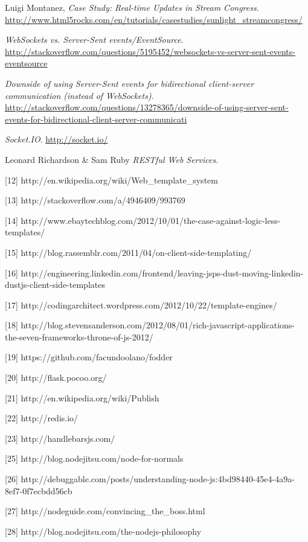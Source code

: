 \documentclass[doc,helv,longtable]{article}
\begin{document}
\begin{thebibliography}{150}
  Luigi Montanez,
  \emph{Case Study: Real-time Updates in Stream Congress}.
  \url{http://www.html5rocks.com/en/tutorials/casestudies/sunlight_streamcongress/}

  \emph{WebSockets vs. Server-Sent events/EventSource}.
  \url{http://stackoverflow.com/questions/5195452/websockets-vs-server-sent-events-eventsource}

  \emph{Downside of using Server-Sent events for bidirectional client-server communication (instead of WebSockets)}.
  \url{http://stackoverflow.com/questions/13278365/downside-of-using-server-sent-events-for-bidirectional-client-server-communicati}

  \emph{Socket.IO}.
  \url{http://socket.io/}

  Leonard Richardson & Sam Ruby
  \emph{RESTful Web Services}.


[12] http://en.wikipedia.org/wiki/Web_template_system

[13] http://stackoverflow.com/a/4946409/993769

[14] http://www.ebaytechblog.com/2012/10/01/the-case-against-logic-less-templates/

[15] http://blog.rassemblr.com/2011/04/on-client-side-templating/

[16] http://engineering.linkedin.com/frontend/leaving-jsps-dust-moving-linkedin-dustjs-client-side-templates

[17] http://codingarchitect.wordpress.com/2012/10/22/template-engines/

[18] http://blog.stevensanderson.com/2012/08/01/rich-javascript-applications-the-seven-frameworks-throne-of-js-2012/

[19] https://github.com/facundoolano/fodder

[20] http://flask.pocoo.org/

[21] http://en.wikipedia.org/wiki/Publish%

[22] http://redis.io/

[23] http://handlebarsjs.com/

[25] http://blog.nodejitsu.com/node-for-normals

[26] http://debuggable.com/posts/understanding-node-js:4bd98440-45e4-4a9a-8ef7-0f7ecbdd56cb

[27] http://nodeguide.com/convincing_the_boss.html

[28] http://blog.nodejitsu.com/the-nodejs-philosophy


\end{thebibliography}
\end{document}
